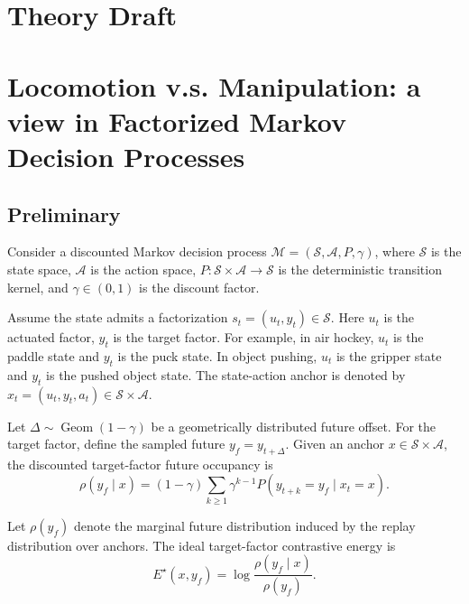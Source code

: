 



\section{Theory Draft}

\section{Locomotion v.s. Manipulation: a view in Factorized Markov Decision Processes}

\subsection{Preliminary}


Consider a discounted Markov decision process $\mathcal M=(\mathcal S,\mathcal A,P,\gamma)$, where \(\mathcal S\) is the state space, \(\mathcal A\) is the action space, \(P: \mathcal S \times \mathcal A \rightarrow \mathcal S\) is the deterministic transition kernel, and \(\gamma\in(0,1)\) is the discount factor. 

Assume the state admits a factorization \(s_t=(u_t,y_t)\in\mathcal S\). Here \(u_t\) is the actuated factor, \(y_t\) is the target factor. For example, in air hockey, \(u_t\) is the paddle state and \(y_t\) is the puck state. In object pushing, \(u_t\) is the gripper state and \(y_t\) is the pushed object state. The state-action anchor is denoted by \(x_t=(u_t,y_t,a_t)\in \mathcal S\times\mathcal A\).


Let \(\Delta\sim \operatorname{Geom}(1-\gamma)\) be a geometrically distributed future offset. For the target factor, define the sampled future \(y_f = y_{t+\Delta}\). Given an anchor \(x\in\mathcal S\times\mathcal A\), the discounted target-factor future occupancy is
\begin{equation}
\rho(y_f\mid x)
=
(1-\gamma)
\sum_{k\ge 1}
\gamma^{k-1}
P(y_{t+k}=y_f\mid x_t=x).
\end{equation}

Let \(\rho(y_f)\) denote the marginal future distribution induced by the replay distribution over anchors. The ideal target-factor contrastive energy is
\begin{equation}
E^\star(x,y_f)
=
\log
\frac{\rho(y_f\mid x)}{\rho(y_f)}.
\end{equation}

